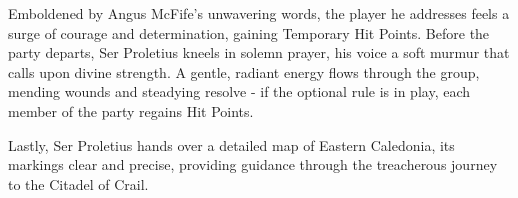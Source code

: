 {\noindent\entryfont Emboldened by Angus McFife's unwavering words, the player he addresses feels a surge of courage and determination, gaining  Temporary Hit Points. Before the party departs, Ser Proletius kneels in solemn prayer, his voice a soft murmur that calls upon divine strength. A gentle, radiant energy flows through the group, mending wounds and steadying resolve - if the optional rule is in play, each member of the party regains  Hit Points.

Lastly, Ser Proletius hands over a detailed map of Eastern Caledonia, its markings clear and precise, providing guidance through the treacherous journey to the Citadel of Crail.}

\vfill\eject


